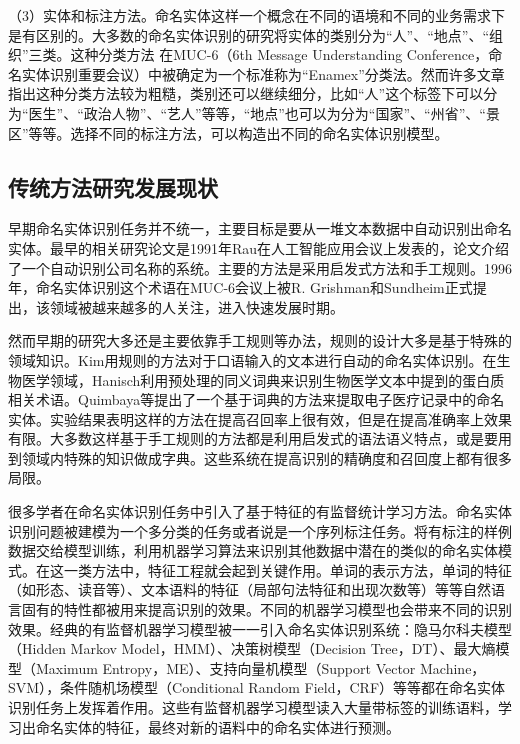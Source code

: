 \documentclass[winfonts,master,oneside,nobackinfo]{njuthesis}
\begin{document}
（3）实体和标注方法。命名实体这样一个概念在不同的语境和不同的业务需求下是有区别的。大多数的命名实体识别的研究将实体的类别分为“人”、“地点”、“组织”三类。这种分类方法 在MUC-6（6th Message Understanding Conference，命名实体识别重要会议）中被确定为一个标准称为“Enamex”分类法。然而许多文章指出这种分类方法较为粗糙，类别还可以继续细分，比如“人”这个标签下可以分为“医生”、“政治人物”、“艺人”等等，“地点”也可以为分为“国家”、“州省”、“景区”等等。选择不同的标注方法，可以构造出不同的命名实体识别模型。

\subsection{传统方法研究发展现状}
早期命名实体识别任务并不统一，主要目标是要从一堆文本数据中自动识别出命名实体。最早的相关研究论文是1991年Rau\cite{Rau}在人工智能应用会议上发表的，论文介绍了一个自动识别公司名称的系统。主要的方法是采用启发式方法和手工规则。1996年，命名实体识别这个术语在MUC-6会议上被R. Grishman和Sundheim正式提出，该领域被越来越多的人关注，进入快速发展时期。

然而早期的研究大多还是主要依靠手工规则等办法，规则的设计大多是基于特殊的领域知识。Kim\cite{Kim}用规则的方法对于口语输入的文本进行自动的命名实体识别。在生物医学领域，Hanisch\cite{Hanisch}利用预处理的同义词典来识别生物医学文本中提到的蛋白质相关术语。Quimbaya\cite{Quimbaya}等提出了一个基于词典的方法来提取电子医疗记录中的命名实体。实验结果表明这样的方法在提高召回率上很有效，但是在提高准确率上效果有限。大多数这样基于手工规则的方法都是利用启发式的语法语义特点，或是要用到领域内特殊的知识做成字典。这些系统在提高识别的精确度和召回度上都有很多局限。

很多学者在命名实体识别任务中引入了基于特征的有监督统计学习方法。命名实体识别问题被建模为一个多分类的任务或者说是一个序列标注任务。将有标注的样例数据交给模型训练，利用机器学习算法来识别其他数据中潜在的类似的命名实体模式。在这一类方法中，特征工程就会起到关键作用。单词的表示方法\cite{Nadeau}，单词的特征（如形态、读音等）\cite{Settles}、文本语料的特征（局部句法特征和出现次数等）\cite{Ravin}等等自然语言固有的特性都被用来提高识别的效果。不同的机器学习模型也会带来不同的识别效果。经典的有监督机器学习模型被一一引入命名实体识别系统：隐马尔科夫模型（Hidden Markov Model，HMM）\cite{Eddy}、决策树模型（Decision Tree，DT）\cite{Quinlan}、最大熵模型（Maximum Entropy，ME）\cite{Kapur}、支持向量机模型（Support Vector Machine，SVM）\cite{Hearst}，条件随机场模型（Conditional Random Field，CRF）\cite{Lafferty}等等都在命名实体识别任务上发挥着作用。这些有监督机器学习模型读入大量带标签的训练语料，学习出命名实体的特征，最终对新的语料中的命名实体进行预测。
\end{document}
